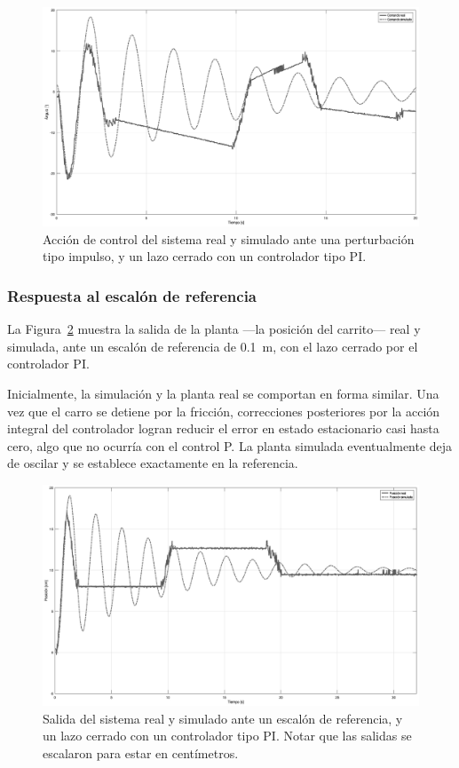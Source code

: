 \begin{figure}[!tbp]
    \centering
    \includegraphics[width=\linewidth]{img/pi-pert-cont.eps}
    \caption{Acción de control del sistema real y simulado ante una perturbación tipo impulso, y un lazo cerrado con un controlador tipo PI.}
    \label{fig:pi-pert-cont}
\end{figure}

\subsubsection{Respuesta al escalón de referencia}

La Figura~\ref{fig:pi-ref-salida} muestra la salida de la planta ---la posición del carrito--- real y simulada, ante un escalón de referencia de \qty{0.1}{\m}, con el lazo cerrado por el controlador PI.

Inicialmente, la simulación y la planta real se comportan en forma similar. Una vez que el carro se detiene por la fricción, correcciones posteriores por la acción integral del controlador logran reducir el error en estado estacionario casi hasta cero, algo que no ocurría con el control P. La planta simulada eventualmente deja de oscilar y se establece exactamente en la referencia.

\begin{figure}[!tbp]
    \centering
    \includegraphics[width=\linewidth]{img/pi-ref-salida.eps}
    \caption{Salida del sistema real y simulado ante un escalón de referencia, y un lazo cerrado con un controlador tipo PI. Notar que las salidas se escalaron para estar en centímetros.}
    \label{fig:pi-ref-salida}
\end{figure}

